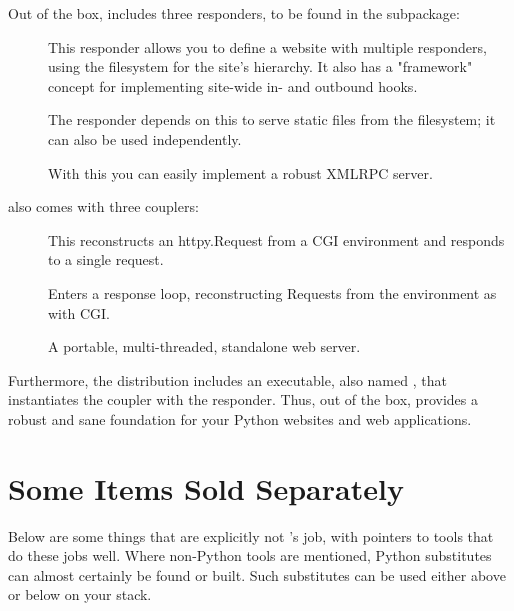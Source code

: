 Out of the box,  includes three responders, to be found in the
 subpackage:

\begin{description}

\item[]
    {This responder allows you to define a website with multiple responders,
    using the filesystem for the site's hierarchy. It also has a "framework"
    concept for implementing site-wide in- and outbound hooks.}

\item[]
    {The  responder depends on this to serve static files from
    the filesystem; it can also be used independently.}

\item[]
    {With this you can easily implement a robust XMLRPC server.}

\end{description}


 also comes with three couplers:

\begin{description}

\item[]
    {This reconstructs an httpy.Request from a CGI environment and responds to
    a single request.}

\item[]
    {Enters a response loop, reconstructing Requests from the environment as
    with CGI.}

\item[]
    {A portable, multi-threaded, standalone web server.}

\end{description}


Furthermore, the  distribution includes an executable, also named
, that instantiates the  coupler with the
 responder. Thus, out of the box,  provides a
robust and sane foundation for your Python websites and web applications.


\section{Some Items Sold Separately \label{sold-separately}}

Below are some things that are explicitly not 's job, with
pointers to tools that do these jobs well. Where non-Python tools are mentioned,
Python substitutes can almost certainly be found or built. Such substitutes can
be used either above or below  on your stack.

